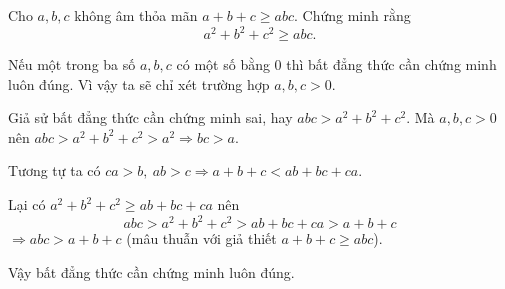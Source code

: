 \begin{problem}
	Cho $a, b, c$ không âm thỏa mãn $a + b + c \ge abc$. Chứng minh rằng
	\[
		a^2 + b^2 + c^2 \ge abc.
	\]
	\solution

	Nếu một trong ba số $a, b, c$ có một số bằng $0$ thì bất đẳng thức cần chứng minh luôn đúng. Vì vậy ta sẽ chỉ xét trường hợp $a, b, c > 0$.

	Giả sử bất đẳng thức cần chứng minh sai, hay $abc > a^2 + b^2 + c^2$. Mà $a , b, c > 0$ nên $abc > a^2 + b^2 + c^2 > a^2 \Rightarrow bc > a$.

	Tương tự ta có $ca > b,\ ab > c \Rightarrow a + b + c < ab + bc + ca$.

	Lại có $a^2 + b^2 + c^2 \ge ab + bc + ca$ nên
	$$
		abc > a^2 + b^2 + c^2 > ab + bc + ca > a + b + c
	$$ 
	$\Rightarrow abc > a + b + c$ (mâu thuẫn với giả thiết $a + b + c \ge abc$).

	Vậy bất đẳng thức cần chứng minh luôn đúng.
\end{problem}